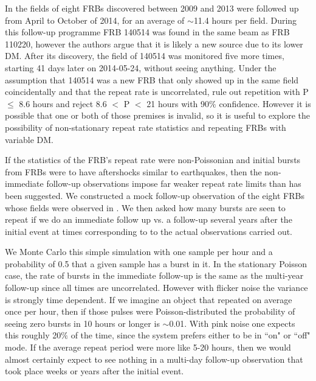 \documentclass[useAMS,usenatbib]{mn2e}
\begin{document}
In \cite{2015MNRAS.454..457P}
the fields of eight FRBs discovered between 2009 and 2013
were followed up from April to October of 2014, for an average 
of $\sim$11.4 hours per field. During this follow-up programme 
FRB 140514 was found in the same beam as FRB 110220, however
the authors argue that it is likely a new source due to its lower DM. 
After its discovery, the field of 140514 was monitored 
five more times, starting 41 days later on 2014-05-24, without seeing anything.
Under the assumption that 140514 was a new FRB 
that only showed up in the same field 
coincidentally and that the repeat rate is uncorrelated,
 \cite{2015MNRAS.454..457P} rule out repetition with P $\le$ 8.6 
hours and reject 8.6 $<$ P $<$ 21 hours with 90$\%$ confidence.
However it is possible that one or both of those premises 
is invalid, so it is useful to explore the possibility of non-stationary 
repeat rate statistics and repeating FRBs with variable DM. 

If the statistics of the FRB's repeat rate were
non-Poissonian and initial bursts from FRBs were to have aftershocks
similar to earthquakes, then the non-immediate follow-up observations 
impose far weaker repeat rate limits than has been suggested. We 
constructed a mock follow-up observation of the eight FRBs whose
fields were observed in \cite{2015MNRAS.454..457P}. We then 
asked how many bursts are seen to repeat if we do an immediate
follow up vs. a follow-up several years after the initial event 
at times corresponding to 
to the actual observations carried out. 

We Monte Carlo this 
simple simulation with one sample per hour and a probability of 0.5 
that a given sample has a burst in it. 
In the stationary Poisson case, the rate of bursts in 
the immediate follow-up is the same as the multi-year follow-up 
since all times are 
uncorrelated. However with flicker noise 
the variance is strongly time dependent. If we imagine an object that 
repeated on average once per hour, then if those pulses were Poisson-distributed 
the probability of seeing zero bursts in 10 hours or longer is $\sim$0.01. With 
pink noise one expects this roughly 20$\%$ of the time, since the system 
prefers either to be in ``on" or ``off" mode. If the average repeat period were more 
like 5-20 hours, then we would almost certainly expect to see nothing in a multi-day follow-up 
observation that took place weeks or years after the initial event.
\end{document}
